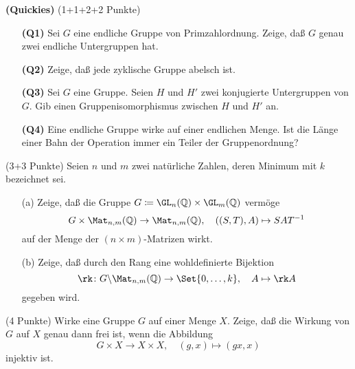 \documentclass{algsheet}
\begin{document}
\newpage

\begin{exercise}\textbf{(Quickies)} (1+1+2+2 Punkte)\vspace{-1ex}
\begin{itemize}
    \item [\textbf{(Q1)}]Sei \(G\) eine endliche Gruppe von      	Primzahlordnung. Zeige, daß \(G\)
    genau zwei endliche Untergruppen hat.
    \item [\textbf{(Q2)}]  Zeige, daß jede zyklische Gruppe abelsch 	                       ist.
    \item [\textbf{(Q3)}]    Sei \(G\) eine Gruppe. Seien \(H\)   	und  \(H'\) zwei konjugierte Untergruppen
    von \(G\). Gib einen Gruppenisomorphismus zwischen \(H\) und   	\(H'\) an.
    \item [\textbf{(Q4)}]     Eine endliche Gruppe wirke auf einer endlichen Menge. Ist die Länge einer
    Bahn der Operation immer ein Teiler der Gruppenordnung?
\end{itemize}
\end{exercise}



\begin{exercise}(3+3 Punkte)\newline
    Seien \(n\) und \(m\) zwei natürliche Zahlen, deren Minimum mit \(k\)
    bezeichnet sei. 
\begin{itemize}
  \item [(a)] Zeige, daß die Gruppe
    \(G \coloneqq \GL_n(\mathbb Q) \times \GL_m(\mathbb Q)\) vermöge
    \begin{equation}
        G \times \Mat_{n, m}(\mathbb Q) \to \Mat_{n, m}(\mathbb Q),\quad
        ((S, T), A) \mapsto S A T^{-1}
    \end{equation}
    auf der Menge der \((n \times m)\)-Matrizen wirkt.
 \item [(b)] Zeige, daß durch den Rang
    eine wohldefinierte Bijektion
    \begin{equation}
        \rk\colon G \backslash \Mat_{n, m}(\mathbb Q) \to \Set{0, \dotsc, k},
        \quad A \mapsto \rk A
    \end{equation}
    gegeben wird.
\end{itemize}
\end{exercise}






\begin{exercise}(4 Punkte)\newline
    Wirke eine Gruppe \(G\) auf einer Menge \(X\). Zeige, daß die Wirkung von
    \(G\) auf \(X\) genau dann frei ist, wenn die Abbildung
    \begin{equation}    
        G \times X \to X \times X,\quad
        (g, x) \mapsto (gx, x)
    \end{equation}
    injektiv ist.
\end{exercise}
\end{document}
